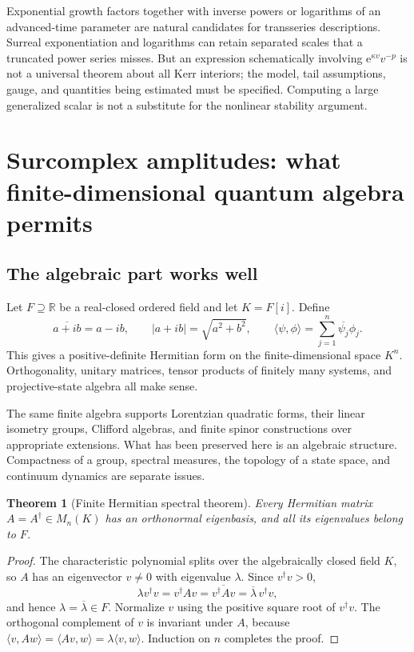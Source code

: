 \documentclass[11pt,a4paper]{article}
\numberwithin{equation}{section}
\newtheorem{theorem}{Theorem}[section]
\theoremstyle{definition}
\theoremstyle{remark}
\newcommand{\R}{\mathbb R}
\newcommand{\ee}{\mathrm e}
\begin{document}
Exponential growth factors together with inverse powers or logarithms of an
advanced-time parameter are natural candidates for transseries descriptions.
Surreal exponentiation and logarithms can retain separated scales that a
truncated power series misses. But an expression schematically involving
$\ee^{\kappa v}v^{-p}$ is not a universal theorem about all Kerr interiors;
the model, tail assumptions, gauge, and quantities being estimated must be
specified. Computing a large generalized scalar is not a substitute for the
nonlinear stability argument.

\section{Surcomplex amplitudes: what finite-dimensional quantum algebra permits}\label{sec:quantum}

\subsection{The algebraic part works well}
Let $F\supseteq\R$ be a real-closed ordered field and let $K=F[i]$. Define
\[
\overline{a+ib}=a-ib,\qquad |a+ib|=\sqrt{a^2+b^2},
\qquad \langle\psi,\phi\rangle=\sum_{j=1}^n\overline{\psi_j}\phi_j.
\]
This gives a positive-definite Hermitian form on the finite-dimensional space
$K^n$. Orthogonality, unitary matrices, tensor products of finitely many systems,
and projective-state algebra all make sense.

The same finite algebra supports Lorentzian quadratic forms, their linear
isometry groups, Clifford algebras, and finite spinor constructions over
appropriate extensions. What has been preserved here is an algebraic
structure. Compactness of a group, spectral measures, the topology of a state
space, and continuum dynamics are separate issues.

\begin{theorem}[Finite Hermitian spectral theorem]\label{thm:spectral}
Every Hermitian matrix $A=A^\dagger\in M_n(K)$ has an orthonormal eigenbasis,
and all its eigenvalues belong to $F$.
\end{theorem}
\begin{proof}
The characteristic polynomial splits over the algebraically closed field $K$,
so $A$ has an eigenvector $v\ne0$ with eigenvalue $\lambda$. Since
$v^\dagger v>0$,
\[
\lambda v^\dagger v=v^\dagger Av
 =\overline{v^\dagger Av}=\overline\lambda\,v^\dagger v,
\]
and hence $\lambda=\overline\lambda\in F$. Normalize $v$ using the positive
square root of $v^\dagger v$. The orthogonal complement of $v$ is invariant
under $A$, because
$\langle v,Aw\rangle=\langle Av,w\rangle=\lambda\langle v,w\rangle$.
Induction on $n$ completes the proof.
\end{proof}
\end{document}
